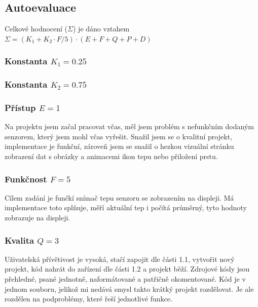 \documentclass[11pt,a4paper]{article}
\begin{document}
            \subsection{Autoevaluace}

                Celkové hodnocení ($\Sigma$) je dáno vztahem $\Sigma = (K_1 + K_2 \cdot F/5) \cdot (E + F + Q + P + D)$

                \subsubsection*{Konstanta $K_1 = 0.25$}
                \subsubsection*{Konstanta $K_2 = 0.75$}
                
                \subsubsection*{Přístup $E = 1$}

                Na projektu jsem začal pracovat včas, měl jsem problém s nefunkčním dodaným senzorem, který jsem mohl včas
                vyřešit. Snažil jsem se o kvalitní projekt, implementace je funkční, zároveň jsem se snažil o hezkou vizuální
                stránku zobrazení dat s obrázky a animacemi ikon tepu nebo přiložení prstu.

                \subsubsection*{Funkčnost $F = 5$}

                Cílem zadání je funčkí snímač tepu senzoru se zobrazením na displeji. Má implementace toto splňuje, měří
                aktuální tep i počítá průměrný, tyto hodnoty zobrazuje na displeji.

                \subsubsection*{Kvalita $Q = 3$}

                Uživatelská přívětivost je vysoká, stačí zapojit dle části 1.1, vytvořit nový projekt, kód nahrát do zařízení
                dle části 1.2 a projekt běží. Zdrojové kódy jsou přehledné, psané jednotně, naformátované a patřičně okomentované.
                Kód je v jednom souboru, jelikož mi nedává smysl takto krátký projekt rozdělovat. Je ale rozdělen na podproblémy,
                které řeší jednotlivé funkce.
\end{document}
